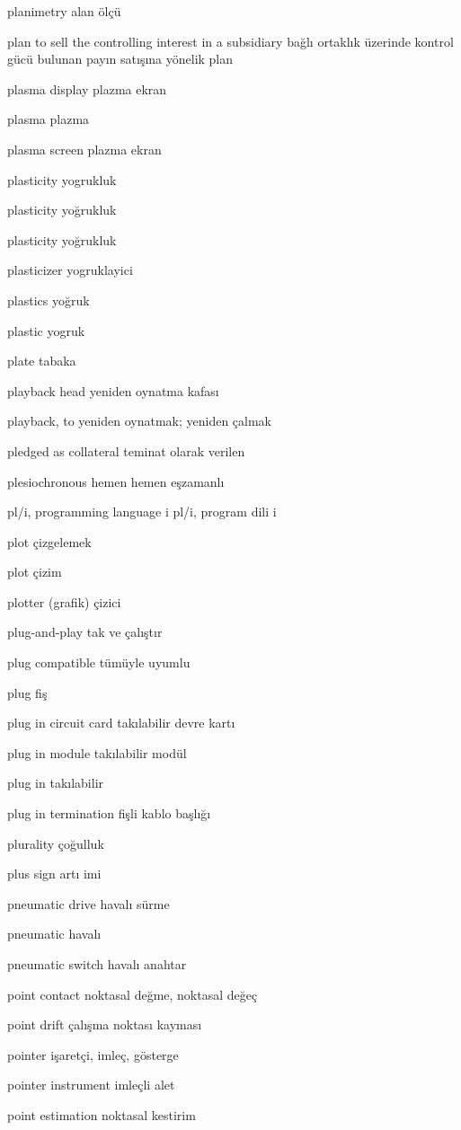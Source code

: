 \documentclass[12pt,fleqn]{article}\usepackage{../../common}
\begin{document}
planimetry alan ölçü

plan to sell the controlling interest in a subsidiary bağlı ortaklık üzerinde kontrol gücü bulunan payın satışına yönelik plan

plasma display plazma ekran

plasma plazma

plasma screen plazma ekran

plasticity yogrukluk

plasticity yoğrukluk

plasticity yoğrukluk

plasticizer yogruklayici

plastics yoğruk

plastic yogruk

plate tabaka

playback head yeniden oynatma kafası

playback, to yeniden oynatmak; yeniden çalmak

pledged as collateral teminat olarak verilen

plesiochronous hemen hemen eşzamanlı

pl/i, programming language i pl/i, program dili i

plot çizgelemek

plot çizim

plotter (grafik) çizici

plug-and-play tak ve çalıştır

plug compatible tümüyle uyumlu

plug fiş

plug in circuit card takılabilir devre kartı

plug in module takılabilir modül

plug in takılabilir

plug in termination fişli kablo başlığı

plurality çoğulluk

plus sign artı imi

pneumatic drive havalı sürme

pneumatic havalı

pneumatic switch havalı anahtar

point contact noktasal değme, noktasal değeç

point drift çalışma noktası kayması

pointer işaretçi, imleç, gösterge

pointer instrument imleçli alet

point estimation noktasal kestirim
\end{document}
